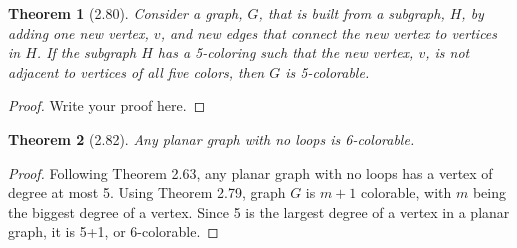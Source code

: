\documentclass{article}
\newtheorem*{thm}{Theorem}
\begin{document}
\begin{thm}[2.80]
	Consider a graph, $G$, that is built from a subgraph, $H$, by adding one new vertex, $v$, and new edges that connect the new vertex to vertices in $H$. If the subgraph $H$ has a 5-coloring such that the new vertex, $v$, is 
	not adjacent to vertices of all five colors, then $G$ is 5-colorable.
\end{thm}
\begin{proof}
    Write your proof here.
\end{proof}

\begin{thm}[2.82]
	Any planar graph with no loops is 6-colorable.
\end{thm}
\begin{proof}
	Following Theorem 2.63, any planar graph with no loops has a vertex of degree at most 5. Using Theorem 2.79,  graph $G$ is $m+1$ colorable, with $m$ being the biggest degree of a vertex.
	Since 5 is the largest degree of a vertex in a planar graph, it is 5+1, or 6-colorable.
\end{proof}
\end{document}
